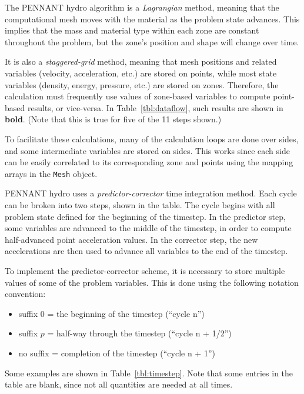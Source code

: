 \documentclass[11pt,letterpaper]{article} %
\begin{document}
The PENNANT hydro algorithm is a {\em Lagrangian} method, meaning that
the computational mesh moves with the material as the problem state
advances.  This implies that the mass and material type within each zone
are constant throughout the problem, but the zone's position and shape
will change over time.

It is also a {\em staggered-grid} method, meaning that mesh positions and
related variables (velocity, acceleration, etc.) are stored on points,
while most state variables (density, energy, pressure, etc.) are stored
on zones.  Therefore, the calculation must frequently use values of
zone-based variables to compute point-based results, or vice-versa.
In Table~\ref{tbl:dataflow}, such results are shown in {\bf bold}.
(Note that this is true for five of the 11 steps shown.)

To facilitate these calculations, many of the calculation loops are done
over sides, and some intermediate variables are stored on sides.
This works since each side can be easily correlated to its
corresponding zone and points using the mapping arrays in the {\tt Mesh}
object.

PENNANT hydro uses a {\em predictor-corrector} time integration
method.  Each cycle can be broken into two steps, shown in the table.
The cycle begins with all problem state defined for the beginning of the
timestep.  In the predictor step, some variables are advanced to the
middle of the timestep, in order to compute half-advanced point
acceleration values.  In the corrector step, the new accelerations are
then used to advance all variables to the end of the timestep.

To implement the predictor-corrector scheme, it is necessary to store
multiple values of some of the problem variables.  This is done
using the following notation convention:
\begin{itemize}
\item suffix $0$ = the beginning of the timestep (``cycle n'')
\item suffix $p$ = half-way through the timestep (``cycle n + 1/2'')
\item no suffix = completion of the timestep    (``cycle n + 1'')
\end{itemize}
Some examples are shown in Table~\ref{tbl:timestep}.
Note that some entries in the table are blank, since not all quantities
are needed at all times.
\end{document}
